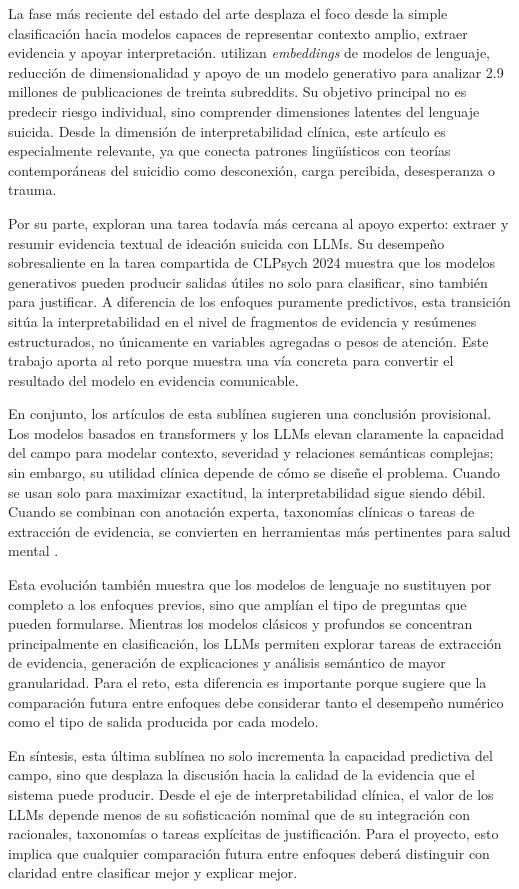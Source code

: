 La fase más reciente del estado del arte desplaza el foco desde la simple clasificación hacia modelos capaces de representar contexto amplio, extraer evidencia y apoyar interpretación. \citet{bauer2024llm} utilizan \textit{embeddings} de modelos de lenguaje, reducción de dimensionalidad y apoyo de un modelo generativo para analizar 2.9 millones de publicaciones de treinta subreddits. Su objetivo principal no es predecir riesgo individual, sino comprender dimensiones latentes del lenguaje suicida. Desde la dimensión de interpretabilidad clínica, este artículo es especialmente relevante, ya que conecta patrones lingüísticos con teorías contemporáneas del suicidio como desconexión, carga percibida, desesperanza o trauma.

Por su parte, \citet{singh2024evidence} exploran una tarea todavía más cercana al apoyo experto: extraer y resumir evidencia textual de ideación suicida con LLMs. Su desempeño sobresaliente en la tarea compartida de CLPsych 2024 muestra que los modelos generativos pueden producir salidas útiles no solo para clasificar, sino también para justificar. A diferencia de los enfoques puramente predictivos, esta transición sitúa la interpretabilidad en el nivel de fragmentos de evidencia y resúmenes estructurados, no únicamente en variables agregadas o pesos de atención. Este trabajo aporta al reto porque muestra una vía concreta para convertir el resultado del modelo en evidencia comunicable.

En conjunto, los artículos de esta sublínea sugieren una conclusión provisional. Los modelos basados en transformers y los LLMs elevan claramente la capacidad del campo para modelar contexto, severidad y relaciones semánticas complejas; sin embargo, su utilidad clínica depende de cómo se diseñe el problema. Cuando se usan solo para maximizar exactitud, la interpretabilidad sigue siendo débil. Cuando se combinan con anotación experta, taxonomías clínicas o tareas de extracción de evidencia, se convierten en herramientas más pertinentes para salud mental \citep{bao2025redsm5, bauer2024llm, singh2024evidence}.

Esta evolución también muestra que los modelos de lenguaje no sustituyen por completo a los enfoques previos, sino que amplían el tipo de preguntas que pueden formularse. Mientras los modelos clásicos y profundos se concentran principalmente en clasificación, los LLMs permiten explorar tareas de extracción de evidencia, generación de explicaciones y análisis semántico de mayor granularidad. Para el reto, esta diferencia es importante porque sugiere que la comparación futura entre enfoques debe considerar tanto el desempeño numérico como el tipo de salida producida por cada modelo.

En síntesis, esta última sublínea no solo incrementa la capacidad predictiva del campo, sino que desplaza la discusión hacia la calidad de la evidencia que el sistema puede producir. Desde el eje de interpretabilidad clínica, el valor de los LLMs depende menos de su sofisticación nominal que de su integración con racionales, taxonomías o tareas explícitas de justificación. Para el proyecto, esto implica que cualquier comparación futura entre enfoques deberá distinguir con claridad entre clasificar mejor y explicar mejor.
